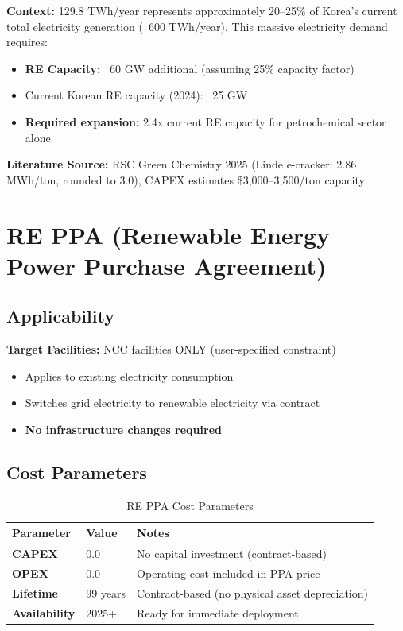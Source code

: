 \documentclass[11pt,a4paper]{report}
\begin{document}
\textbf{Context:} 129.8 TWh/year represents approximately 20--25\% of Korea's current total electricity generation (~600 TWh/year). This massive electricity demand requires:
\begin{itemize}[leftmargin=*]
    \item \textbf{RE Capacity:} ~60 GW additional (assuming 25\% capacity factor)
    \item Current Korean RE capacity (2024): ~25 GW
    \item \textbf{Required expansion:} 2.4x current RE capacity for petrochemical sector alone
\end{itemize}

\textbf{Literature Source:} RSC Green Chemistry 2025 (Linde e-cracker: 2.86 MWh/ton, rounded to 3.0), CAPEX estimates \$3,000--3,500/ton capacity

\clearpage

\section{RE PPA (Renewable Energy Power Purchase Agreement)}

\subsection{Applicability}

\textbf{Target Facilities:} NCC facilities ONLY (user-specified constraint)
\begin{itemize}[leftmargin=*]
    \item Applies to existing electricity consumption
    \item Switches grid electricity to renewable electricity via contract
    \item \textbf{No infrastructure changes required}
\end{itemize}

\subsection{Cost Parameters}

\begin{table}[H]
\centering
\caption{RE PPA Cost Parameters}
\begin{tabular}{p{4cm}p{3cm}p{8cm}}
\toprule
\textbf{Parameter} & \textbf{Value} & \textbf{Notes} \\
\midrule
\textbf{CAPEX} & 0.0 & No capital investment (contract-based) \\
\textbf{OPEX} & 0.0 & Operating cost included in PPA price \\
\textbf{Lifetime} & 99 years & Contract-based (no physical asset depreciation) \\
\textbf{Availability} & 2025+ & Ready for immediate deployment \\
\bottomrule
\end{tabular}
\label{tab:reppa-costs}
\end{table}
\end{document}
